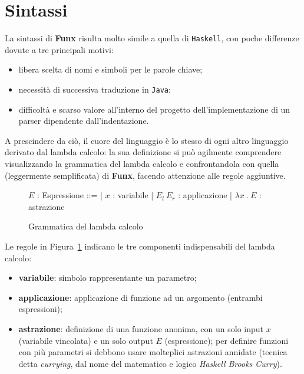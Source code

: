 \section{Sintassi}
\label{sec:2-3-syntax}

La sintassi di \textbf{Funx} risulta molto simile a quella di \texttt{Haskell}, con poche differenze dovute
a tre principali motivi:
\begin{itemize}
    \item libera scelta di nomi e simboli per le parole chiave;
    \item necessità di successiva traduzione in \texttt{Java};
    \item difficoltà e scarso valore all'interno del progetto dell'implementazione di un parser dipendente dall'indentazione.
\end{itemize}

\noindent A prescindere da ciò, il cuore del linguaggio è lo stesso di ogni altro linguaggio derivato dal lambda calcolo:
la sua definizione si può agilmente comprendere visualizzando la grammatica del lambda calcolo e confrontandola con
quella (leggermente semplificata) di \textbf{Funx}, facendo attenzione alle regole aggiuntive.

\begin{figure}
    \vspace{4mm}
    \begin{bnf}
        $E$ : \small{Espressione} ::=
        | $x$ : \small{variabile}
        | $E_l\ E_r$ : \small{applicazione}
        | $\lambda x\ .\ E$ : \small{astrazione}
    \end{bnf}
    \caption{Grammatica del lambda calcolo}
    \label{fig:2-3-lambda-syntax}
    \vspace{4mm}
\end{figure}

\noindent Le regole in Figura~\ref{fig:2-3-lambda-syntax} indicano le tre componenti indispensabili
del lambda calcolo:
\begin{itemize}
    \item \textbf{variabile}: simbolo rappresentante un parametro;
    \item \textbf{applicazione}: applicazione di funzione ad un argomento (entrambi espressioni);
    \item \textbf{astrazione}: definizione di una funzione anonima, con un solo input $x$ (variabile vincolata)
          e un solo output $E$ (espressione); per definire funzioni con più
          parametri si debbono usare molteplici astrazioni annidate (tecnica detta \textit{currying},
          dal nome del matematico e logico \textit{Haskell Brooks Curry}).
\end{itemize}

